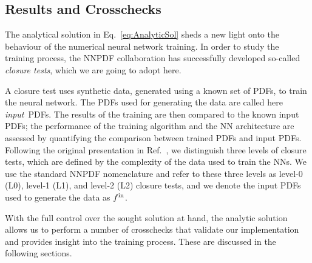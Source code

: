 \subsection{Results and Crosschecks}
\label{sec:TrainClosure}

The analytical solution in Eq.~\eqref{eq:AnalyticSol} sheds a new light onto the
behaviour of the numerical neural network training. In order to study the
training process, the NNPDF collaboration has successfully developed so-called
{\em closure tests}, which we are going to adopt here. 

A closure test uses synthetic data, generated using a known set of PDFs, to
train the neural network. The PDFs used for generating the data are called here
{\em input}\ PDFs. The results of the training are then compared to the known
input PDFs; the performance of the training algorithm and the NN architecture
are assessed by quantifying the comparison between trained PDFs and input PDFs.
Following the original presentation in Ref.~\cite{NNPDF:2014otw}, we distinguish
three levels of closure tests, which are defined by the complexity of the data
used to train the NNs. We use the standard NNPDF nomenclature and refer to these
three levels as level-0 (L0), level-1 (L1), and level-2 (L2) closure tests, and
we denote the input PDFs used to generate the data as $f^{\rm in}$.

With the full control over the sought solution at hand, the analytic solution
allows us to perform a number of crosschecks that validate our implementation
and provides insight into the training process. These are discussed in the
following sections.

